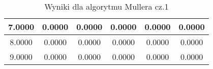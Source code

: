\documentclass[a4paper, 11pt]{article}
\begin{document}
\begin{enumerate}
\begin{itemize}
\begin{table}
\begin{center}
\begin{tabular}{|c|c|c|c|c|c|}
\hline                                                                                     
7.0000 & 0.0000 & 0.0000 & 0.0000 & 0.0000 & 0.0000 \\                                     
\hline                                                                                     
8.0000 & 0.0000 & 0.0000 & 0.0000 & 0.0000 & 0.0000 \\                                     
\hline                                                                                     
9.0000 & 0.0000 & 0.0000 & 0.0000 & 0.0000 & 0.0000 \\                                     
\hline                                                                                     
\end{tabular}                          
\caption{Wyniki dla algorytmu Mullera cz.1}                                                                                                                                                                                          
\label{table:Wyniki dla algorytmu Mullera}                                                                                                                                                                                        
\end{center}
\end{table}                                                                                                                                                                                                       



\end{itemize}
\end{enumerate}
\end{document}

